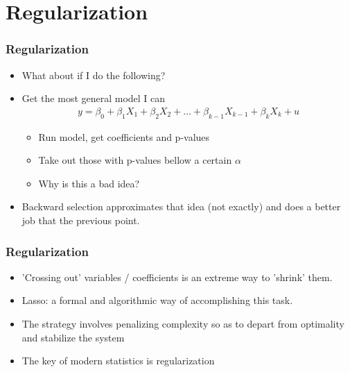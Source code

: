 \documentclass[
  shownotes,
  xcolor={svgnames},
  hyperref={colorlinks,citecolor=DarkBlue,linkcolor=DarkRed,urlcolor=DarkBlue}
  , aspectratio=169]{beamer}
\begin{document}
\section{Regularization}
\begin{frame}[fragile]
\frametitle{Regularization}


\begin{itemize}
  \item What about if I do the following?
\medskip
\item Get the most general model I can
  \begin{align}
  y= \beta_0 + \beta_1 X_1 + \beta_2 X_2 + \dots + \beta_{k-1} X_{k-1} + \beta_k X_k + u 
  \end{align}
\pause
\medskip
\begin{itemize}
    \item Run model, get coefficients and p-values
    \medskip
    \pause
    \item Take out those with p-values bellow a certain $\alpha$
    \medskip
    \pause
    \item Why is this a bad idea?
\end{itemize}
\medskip
\pause
\item Backward selection approximates that idea (not exactly) and does a better job that the previous point.
\end{itemize}
\end{frame}
\begin{frame}[fragile]
\frametitle{Regularization}

\begin{itemize}
  \item 'Crossing out' variables / coefficients is an extreme way to 'shrink' them. 
  \medskip
  \item Lasso: a formal and algorithmic way of accomplishing this task. 
  \medskip
  \item The strategy involves penalizing complexity so as to depart from optimality and stabilize the system
  \medskip
  \item The key of modern statistics is regularization


\end{itemize}
 

\end{frame}
\end{document}
